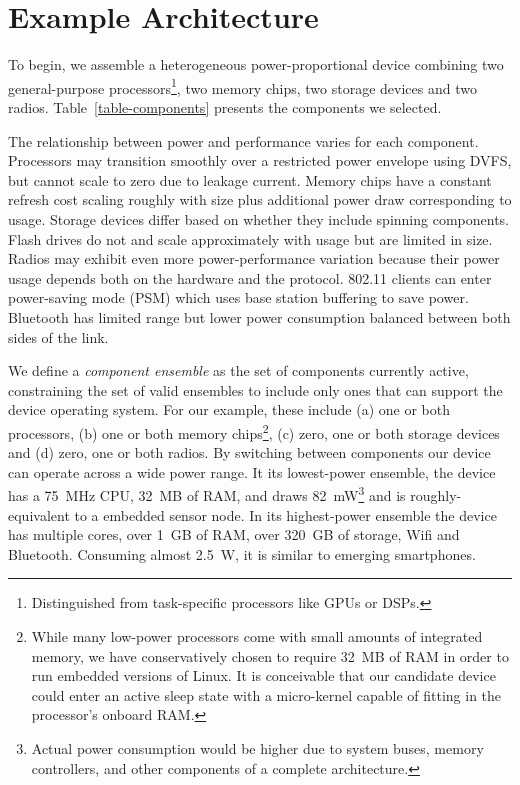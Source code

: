 \section{Example Architecture}
\label{section-architecture}



To begin, we assemble a heterogeneous power-proportional device combining two
general-purpose processors\footnote{Distinguished from task-specific
processors like GPUs or DSPs.}, two memory chips, two storage devices and two
radios. Table~\ref{table-components} presents the components we selected.

The relationship between power and performance varies for each component.
Processors may transition smoothly over a restricted power envelope using
DVFS, but cannot scale to zero due to leakage current. Memory chips have a
constant refresh cost scaling roughly with size plus additional power draw
corresponding to usage. Storage devices differ based on whether they include
spinning components. Flash drives do not and scale approximately with usage
but are limited in size. Radios may exhibit even more power-performance
variation because their power usage depends both on the hardware and the
protocol. 802.11 clients can enter power-saving mode (PSM) which uses base
station buffering to save power. Bluetooth has limited range but lower power
consumption balanced between both sides of the link.

We define a \textit{component ensemble} as the set of components currently
active, constraining the set of valid ensembles to include only ones that can
support the device operating system. For our example, these include (a) one
or both processors, (b) one or both memory chips\footnote{While many
low-power processors come with small amounts of integrated memory, we have
conservatively chosen to require 32~MB of RAM in order to run embedded
versions of Linux. It is conceivable that our candidate device could enter an
active sleep state with a micro-kernel capable of fitting in the processor's
onboard RAM.}, (c) zero, one or both storage devices and (d) zero, one or
both radios. By switching between components our device can operate across a
wide power range. It its lowest-power ensemble, the device has a 75~MHz CPU,
32~MB of RAM, and draws 82~mW\footnote{Actual power consumption would be
higher due to system buses, memory controllers, and other components of a
complete architecture.} and is roughly-equivalent to a embedded sensor node.
In its highest-power ensemble the device has multiple cores, over 1~GB of
RAM, over 320~GB of storage, Wifi and Bluetooth. Consuming almost 2.5~W, it
is similar to emerging smartphones.

